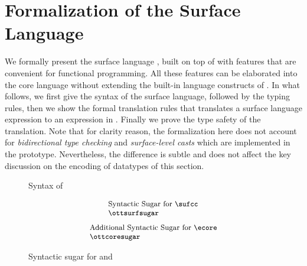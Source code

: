 \section{Formalization of the Surface Language}
\label{sec:surface}


We formally present the surface language \sufcc,
built on top of \name with features that are convenient for functional
programming. All these features
can be elaborated into the core language without extending the
built-in language constructs of \name. In what follows, we first give
the syntax of the surface language, followed by the typing rules, then
we show the formal translation rules that translates a surface
language expression to an expression in \ecore. Finally we prove the
type safety of the translation. Note that for clarity reason, the
formalization here does not account for \emph{bidirectional type checking}
and \emph{surface-level casts} which are implemented in the prototype.
Nevertheless, the difference is subtle and does not affect the key
discussion on the encoding of datatypes of this section.


\begin{figure}[t]
\begin{small}
\centering
\begin{spacing}{0.9}
\gram{\ottpgm\ottinterrule
\ottdecl\ottinterrule
\ottu\ottinterrule
\ottp\ottinterrule
\ottE\ottinterrule
\ottGs}
\end{spacing}
\end{small}
\caption{Syntax of \sufcc}
\label{fig:surface:syntax}
\end{figure}

\begin{figure}[t]
\[\small
    \begin{array}{l}
    \text{Syntactic Sugar for \sufcc} \\
    \ottsurfsugar \end{array}\]
\[\small
    \begin{array}{l}
    \text{Additional Syntactic Sugar for \ecore} \\
    \ottcoresugar \end{array}\]
\caption{Syntactic sugar for \sufcc and \ecore}
\label{fig:surface:sugar}
\end{figure}

